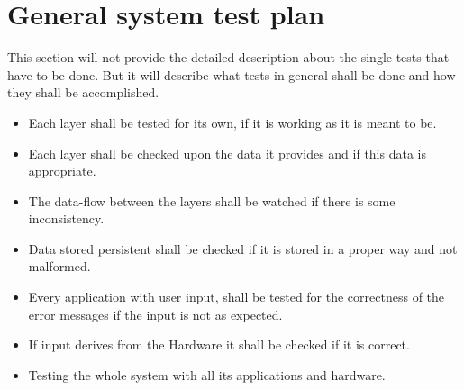  \section{General system test plan}
  \label{sec:analysis:generalSystemTestPlan}
  This section will not provide the detailed description about the single tests that have to be done. But it will describe what tests in general shall be done and how they shall be accomplished.

  \begin{itemize}
   \item Each layer shall be tested for its own, if it is working as it is meant to be.
   \item Each layer shall be checked upon the data it provides and if this data is appropriate.
   \item The data-flow between the layers shall be watched if there is some inconsistency.
   \item Data stored persistent shall be checked if it is stored in a proper way and not malformed.
   \item Every application with user input, shall be tested for the correctness of the error messages if the input is not as expected.
   \item If input derives from the Hardware it shall be checked if it is correct.
   \item Testing the whole system with all its applications and hardware.
  \end{itemize}
